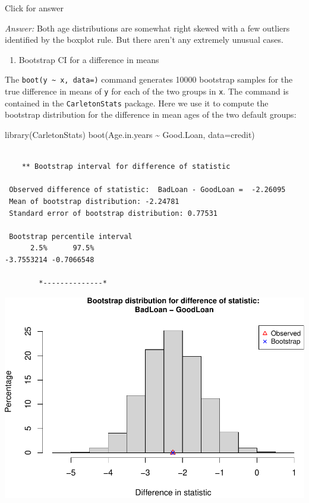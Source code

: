 \documentclass[
]{book}
\newenvironment{Shaded}{\begin{snugshade}}{\end{snugshade}}
\newcommand{\AttributeTok}[1]{\textcolor[rgb]{0.77,0.63,0.00}{#1}}
\newcommand{\FunctionTok}[1]{\textcolor[rgb]{0.00,0.00,0.00}{#1}}
\newcommand{\NormalTok}[1]{#1}
\newcommand{\SpecialCharTok}[1]{\textcolor[rgb]{0.00,0.00,0.00}{#1}}
\providecommand{\tightlist}{%
  \setlength{\itemsep}{0pt}\setlength{\parskip}{0pt}}
\begin{document}
Click for answer

\emph{Answer:} Both age distributions are somewhat right skewed with a few outliers identified by the boxplot rule. But there aren't any extremely unusual cases.

\begin{enumerate}
\def\labelenumi{(\alph{enumi})}
\setcounter{enumi}{1}
\tightlist
\item
  Bootstrap CI for a difference in means
\end{enumerate}

The \texttt{boot(y\ \textasciitilde{}\ x,\ data=)} command generates 10000 bootstrap samples for the true difference in means of \texttt{y} for each of the two groups in \texttt{x}. The command is contained in the \texttt{CarletonStats} package. Here we use it to compute the bootstrap distribution for the difference in mean ages of the two default groups:

\begin{Shaded}
\begin{Highlighting}[]
\FunctionTok{library}\NormalTok{(CarletonStats)}
\FunctionTok{boot}\NormalTok{(Age.in.years }\SpecialCharTok{\textasciitilde{}}\NormalTok{ Good.Loan, }\AttributeTok{data=}\NormalTok{credit)}
\end{Highlighting}
\end{Shaded}

\begin{verbatim}

    ** Bootstrap interval for difference of statistic

 Observed difference of statistic:  BadLoan - GoodLoan =  -2.26095 
 Mean of bootstrap distribution: -2.24781 
 Standard error of bootstrap distribution: 0.77531 

 Bootstrap percentile interval
      2.5%      97.5% 
-3.7553214 -0.7066548 

        *--------------*
\end{verbatim}

\includegraphics[width=1\linewidth]{Class_Activity_8_files/figure-latex/unnamed-chunk-10-1}
\end{document}
